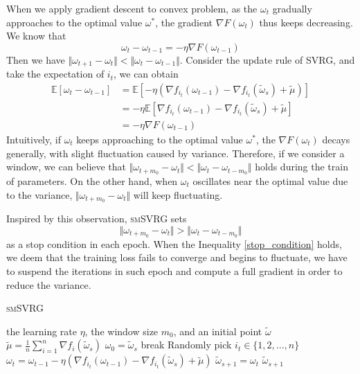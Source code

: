 \documentclass[conference]{IEEEtran}
\begin{document}
 When we apply gradient descent to convex problem, as the $\omega_t$ gradually approaches to the optimal value $\omega^*$, the gradient $\nabla F(\omega_t)$ thus keeps decreasing. We know that
 $$\omega_t - \omega_{t-1} = -\eta\nabla F(\omega_{t-1})$$
 Then we have $\Vert\omega_{t+1}-\omega_t\Vert<\Vert\omega_{t}-\omega_{t-1}\Vert$. 
Consider the update rule of SVRG, and take the expectation of $i_t$, we can obtain
 \begin{equation}
\label{sgdinequality}
\begin{split}
\mathbb{E}[\omega_t -\omega_{t-1}] &=  \mathbb{E}[- \eta(\nabla f_{i_t}(\omega_{t-1}) - \nabla f_{i_t}(\tilde{\omega}_s)+\tilde{\mu})]\\
&=-\eta\mathbb{E}[\nabla f_{i_t}(\omega_{t-1}) - \nabla f_{i_t}(\tilde{\omega}_s)+\tilde{\mu}]\\
&=-\eta\nabla F(\omega_{t-1})
\end{split}
\end{equation}
 Intuitively, if $\omega_t$ keeps approaching to the optimal value $\omega^*$, the $\nabla F(\omega_{t})$ decays generally, with slight fluctuation caused by variance. Therefore, if we consider a window, we can believe that $\Vert\omega_{t+m_0}-\omega_t\Vert<\Vert\omega_{t}-\omega_{t-m_0}\Vert$ holds  during the train of parameters.  
 On the other hand, when $\omega_t$ oscillates near the optimal value due to the variance, $\Vert\omega_{t+m_0}-\omega_t\Vert$ will keep fluctuating. 

 Inspired by this observation, \textsc{smSVRG}  sets 
 \begin{equation}
 \label{stop_condition}
 \Vert\omega_{t+m_0}-\omega_t\Vert>\Vert\omega_{t}-\omega_{t-m_0}\Vert
 \end{equation}
 as a stop condition in each epoch. When the Inequality \ref{stop_condition} holds, we deem that the training loss fails to converge and begins to fluctuate, we have to suspend the iterations in such epoch and compute a full gradient in order to reduce the variance.
 
  \begin{algorithm}[t]
 	\caption{\textsc{smSVRG}}
	\label{smSVRG}
	\begin{algorithmic}[1]
	\Require the learning rate $\eta$, the window size $m_0$, and an initial point $\tilde{\omega}$
		\State $\tilde{\mu} = \frac{1}{n}\sum\limits_{i=1}^{n}\nabla f_{i}(\tilde{\omega}_{s})$
		\State $\omega_0 = \tilde{\omega}_s$
			\State break
			\EndIf
			\State Randomly pick $i_t\in\{1, 2, ..., n\}$
			\State $\omega_t = \omega_{t-1} - \eta(\nabla f_{i_t}(\omega_{t-1}) - \nabla f_{i_t}(\tilde{\omega}_s)+\tilde{\mu})$
		\EndFor		
		\State $\tilde{\omega}_{s+1} = \omega_{t}$
	\EndFor
	\State \Return $\tilde{\omega}_{s+1}$
	\end{algorithmic}
\end{algorithm}
\end{document}
